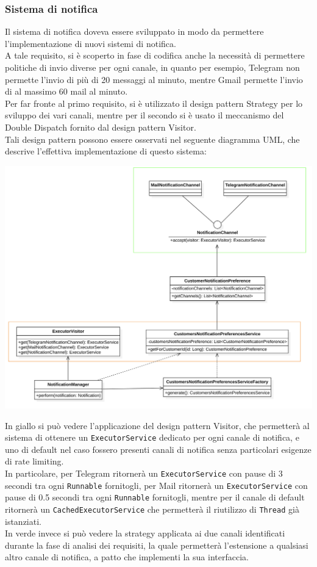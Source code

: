 		\subsubsection{Sistema di notifica}
			Il sistema di notifica doveva essere sviluppato in modo da permettere l'implementazione di nuovi sistemi di notifica.\\
			A tale requisito, si è scoperto in fase di codifica anche la necessità di permettere politiche di invio diverse per ogni canale, in quanto per esempio, Telegram non permette l'invio di più di 20 messaggi al minuto, mentre Gmail permette l'invio di al massimo 60 mail al minuto. \\
			Per far fronte al primo requisito, si è utilizzato il design pattern Strategy per lo sviluppo dei vari canali, mentre per il secondo si è usato il meccanismo del Double Dispatch fornito dal design pattern Visitor.\\
			Tali design pattern possono essere osservati nel seguente diagramma UML, che descrive l'effettiva implementazione di questo sistema:
			\begin{center}
				\includegraphics[keepaspectratio = true, width=16cm]{immagini/notifica.png}
			\end{center}
			In giallo si può vedere l'applicazione del design pattern Visitor, che permetterà al sistema di ottenere un \texttt{ExecutorService} dedicato per ogni canale di notifica, e uno di default nel caso fossero presenti canali di notifica senza particolari esigenze di rate limiting. \\
			In particolare, per Telegram ritornerà un \texttt{ExecutorService} con pause di 3 secondi tra ogni \texttt{Runnable} fornitogli,  per Mail ritornerà un \texttt{ExecutorService} con pause di 0.5 secondi tra ogni \texttt{Runnable} fornitogli, mentre per il canale di default ritornerà un \texttt{CachedExecutorService} che permetterà il riutilizzo di \texttt{Thread} già istanziati.\\
			In verde invece si può vedere la strategy applicata ai due canali identificati durante la fase di analisi dei requisiti, la quale permetterà l'estensione a qualsiasi altro canale di notifica, a patto che implementi la sua interfaccia.\\
